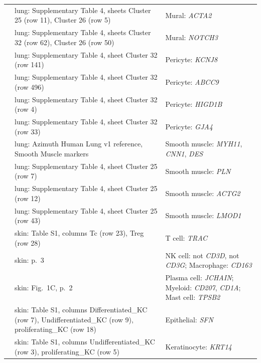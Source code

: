 \begin{longtable}{@{}>{\raggedright\arraybackslash}p{2.0cm} >{\raggedright\arraybackslash}p{4.6cm} >{\raggedright\arraybackslash}p{8.4cm}@{}}
\cite{travagliniMolecularCellAtlas2020} & lung: Supplementary Table 4, sheets Cluster 25 (row 11), Cluster 26 (row 5) & Mural: \textit{ACTA2} \\
\cite{travagliniMolecularCellAtlas2020} & lung: Supplementary Table 4, sheets Cluster 32 (row 62), Cluster 26 (row 50) & Mural: \textit{NOTCH3} \\
\cite{travagliniMolecularCellAtlas2020} & lung: Supplementary Table 4, sheet Cluster 32 (row 141) & Pericyte: \textit{KCNJ8} \\
\cite{travagliniMolecularCellAtlas2020} & lung: Supplementary Table 4, sheet Cluster 32 (row 496) & Pericyte: \textit{ABCC9} \\
\cite{travagliniMolecularCellAtlas2020} & lung: Supplementary Table 4, sheet Cluster 32 (row 4) & Pericyte: \textit{HIGD1B} \\
\cite{travagliniMolecularCellAtlas2020} & lung: Supplementary Table 4, sheet Cluster 32 (row 33) & Pericyte: \textit{GJA4} \\
\cite{travagliniMolecularCellAtlas2020} & lung: Azimuth Human Lung v1 reference, Smooth Muscle markers & Smooth muscle: \textit{MYH11}, \textit{CNN1}, \textit{DES} \\
\cite{travagliniMolecularCellAtlas2020} & lung: Supplementary Table 4, sheet Cluster 25 (row 7) & Smooth muscle: \textit{PLN} \\
\cite{travagliniMolecularCellAtlas2020} & lung: Supplementary Table 4, sheet Cluster 25 (row 12) & Smooth muscle: \textit{ACTG2} \\
\cite{travagliniMolecularCellAtlas2020} & lung: Supplementary Table 4, sheet Cluster 25 (row 43) & Smooth muscle: \textit{LMOD1} \\
\cite{reynoldsDevelopmentalCellPrograms2021} & skin: Table S1, columns Tc (row 23), Treg (row 28) & T cell: \textit{TRAC} \\
\cite{reynoldsDevelopmentalCellPrograms2021} & skin: p.~3 & NK cell: not \textit{CD3D}, not \textit{CD3G}; Macrophage: \textit{CD163} \\
\cite{reynoldsDevelopmentalCellPrograms2021} & skin: Fig.~1C, p.~2 & Plasma cell: \textit{JCHAIN}; Myeloid: \textit{CD207}, \textit{CD1A}; Mast cell: \textit{TPSB2} \\
\cite{reynoldsDevelopmentalCellPrograms2021} & skin: Table S1, columns Differentiated\_KC (row 7), Undifferentiated\_KC (row 9), proliferating\_KC (row 18) & Epithelial: \textit{SFN} \\
\cite{reynoldsDevelopmentalCellPrograms2021} & skin: Table S1, columns Undifferentiated\_KC (row 3), proliferating\_KC (row 5) & Keratinocyte: \textit{KRT14} \\

\end{longtable}
